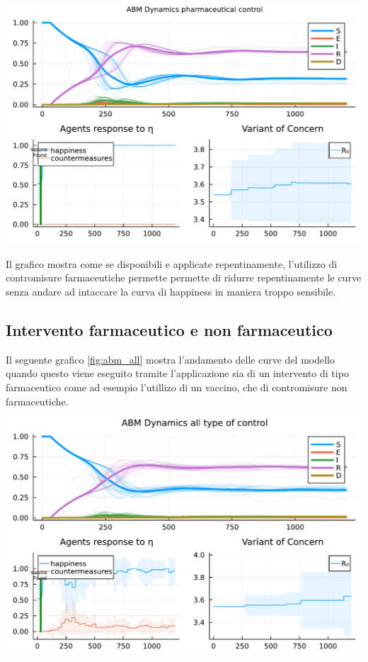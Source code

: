 \begin{minipage}{\linewidth}
	\centering
	\includegraphics[width=\textwidth]{img/SocialNetworkABM_VACCINE.pdf}
	\label{fig:abm_vaccine}
\end{minipage}

Il grafico mostra come se disponibili e applicate repentinamente, l'utilizzo di contromisure farmaceutiche permette 
permette di ridurre repentinamente le curve senza andare ad intaccare la curva di happiness in maniera troppo sensibile.
\newpage

\subsection{Intervento farmaceutico e non farmaceutico}
Il seguente grafico \ref{fig:abm_all} mostra l'andamento delle curve del modello
quando questo viene eseguito tramite l'applicazione sia di un intervento di tipo farmaceutico 
come ad esempio l'utillizo di un vaccino, che di contromisure non farmaceutiche.

\begin{minipage}{\linewidth}
	\centering
	\includegraphics[width=\textwidth]{img/SocialNetworkABM_ALL.pdf}
	\label{fig:abm_all}
\end{minipage}


